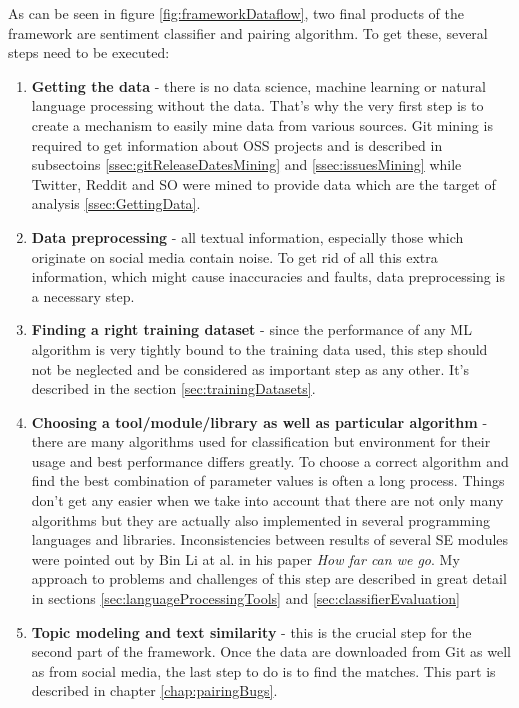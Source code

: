 As can be seen in figure \ref{fig:frameworkDataflow}, two final products of the framework are sentiment classifier and pairing algorithm. To get these, several steps need to be executed:
\begin{enumerate}
\item{\textbf{Getting the data} - there is no data science, machine learning or natural language processing without the data. That's why the very first step is to create a mechanism to easily mine data from various sources. Git mining is required to get information about OSS projects and is described in subsectoins \ref{ssec:gitReleaseDatesMining} and \ref{ssec:issuesMining} while Twitter, Reddit and SO were mined to provide data which are the target of analysis \ref{ssec:GettingData}.}
\item{\textbf{Data preprocessing} - all textual information, especially those which originate on social media contain noise. To get rid of all this extra information, which might cause inaccuracies and faults, data preprocessing is a necessary step.}
\item{\textbf{Finding a right training dataset} - since the performance of any ML algorithm is very tightly bound to the training data used, this step should not be neglected and be considered as important step as any other. It's described in the section \ref{sec:trainingDatasets}.}
\item{\textbf{Choosing a tool/module/library as well as particular algorithm} - there are many algorithms used for classification but environment for their usage and best performance differs greatly. To choose a correct algorithm and find the best combination of parameter values is often a long process. Things don't get any easier when we take into account that there are not only many algorithms but they are actually also implemented in several programming languages and libraries. Inconsistencies between results of several SE modules were pointed out by Bin Li at al. in his paper \textit{How far can we go}. My approach to problems and challenges of this step are described in great detail in sections \ref{sec:languageProcessingTools} and \ref{sec:classifierEvaluation}}
\item{\textbf{Topic modeling and text similarity} - this is the crucial step for the second part of the framework. Once the data are downloaded from Git as well as from social media, the last step to do is to find the matches.   This part is described in chapter \ref{chap:pairingBugs}.}
\end{enumerate}

